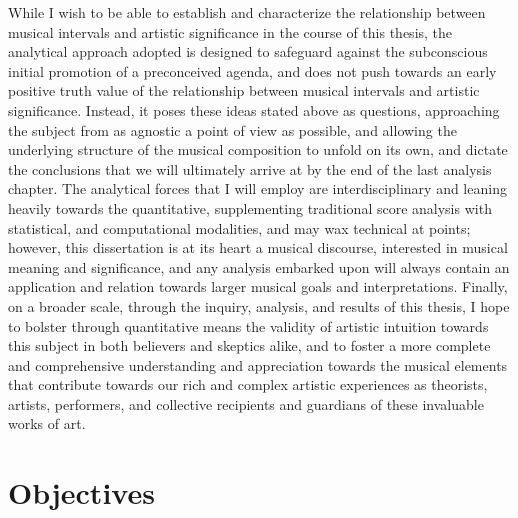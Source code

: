 While I wish to be able to establish and characterize the relationship
between musical intervals and artistic significance in the course of
this thesis, the analytical approach adopted is designed to safeguard
against the subconscious initial promotion of a preconceived agenda, and
does not push towards an early positive truth value of the relationship
between musical intervals and artistic significance. Instead, it poses
these ideas stated above as questions, approaching the subject from as
agnostic a point of view as possible, and allowing the underlying
structure of the musical composition to unfold on its own, and dictate
the conclusions that we will ultimately arrive at by the end of the last
analysis chapter. The analytical forces that I will employ are
interdisciplinary and leaning heavily towards the quantitative,
supplementing traditional score analysis with statistical, and
computational modalities, and may wax technical at points; however, this
dissertation is at its heart a musical discourse, interested in musical
meaning and significance, and any analysis embarked upon will always
contain an application and relation towards larger musical goals and
interpretations. Finally, on a broader scale, through the inquiry,
analysis, and results of this thesis, I hope to bolster through
quantitative means the validity of artistic intuition towards this
subject in both believers and skeptics alike, and to foster a more
complete and comprehensive understanding and appreciation towards the
musical elements that contribute towards our rich and complex artistic
experiences as theorists, artists, performers, and collective recipients
and guardians of these invaluable works of art.

    \section{Objectives}\label{objectives}


